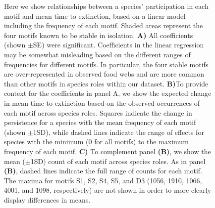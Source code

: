 \documentclass[12pt]{article}
\begin{document}
		\begin{figure}[hb!]
			\caption{Here we show relationships between a species' participation in each motif and mean time to extinction, based on a linear model including the frequency of each motif. Shaded areas represent the four motifs known to be stable in isolation. \textbf{A)} All coefficients (shown $\pm$SE) were significant. Coefficients in the linear regression may be somewhat misleading based on the different ranges of frequencies for different motifs. In particular, the four stable motifs are over-represented in observed food webs and are more common than other motifs in species roles within our dataset. \textbf{B)}To provide context for the coefficients in panel A, we show the expected change in mean time to extinction based on the observed occurrences of each motif across species roles. Squares indicate the change in persistence for a species with the mean frequency of each motif (shown $\pm$1SD), while dashed lines indicate the range of effects for species with the minimum (0 for all motifs) to the maximum frequency of each motif. \textbf{C)} To complement panel \textbf{(B)}, we show the mean ($\pm$1SD) count of each motif across species roles. As in panel \textbf{(B)}, dashed lines indicate the full range of counts for each motif. The maxima for motifs S1, S2, S4, S5, and D3 (1056, 1910, 1066, 4001, and 1098, respectively) are not shown in order to more clearly display differences in means.}
			\label{motif_coefs}

\end{figure}
\end{document}
